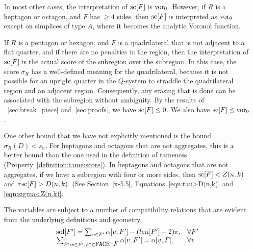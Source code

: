 In most other cases, the interpretation of $\sc[F]$ is $\vor_0$.
However, if $R$ is a heptagon or octagon, and $F$ has $\ge4$
sides, then $\sc[F]$ is interpreted as $\vor_0$ except on
simplices of type $A$, where it becomes the analytic Voronoi
function.

If $R$ is a pentagon or hexagon, and $F$ is a quadrilateral that is
not adjacent to a flat quarter, and if there are no penalties in the
region, then the interpretation of $\sc[F]$ is the actual score of
the subregion over the subregion. In this case, the score $\sigma_R$
has a well-defined meaning for the quadrilateral, because it is not
possible for an upright quarter in the $Q$-system to straddle the
quadrilateral region and an adjacent region. Consequently, any
erasing that is done can be associated with the subregion without
ambiguity. By the results of \Chaps~\ref{sec:break_piece}
and~\ref{sec:proofs}, we have $\sc[F]\le0$. We also have
$\sc[F]\le\vor_0$.

One other bound that we have not explicitly mentioned is the bound
$\sigma_R(D)< s_n$.  For heptagons and octagons that are not
aggregates, this is a better bound than the one used in the
definition of tameness (Property~\ref{definition:tame:score}). In
heptagons and octagons that are not aggregates, if we have a
subregion with four or more sides, then $\sc[F]< Z(n,k)$ and
$\tausc[F]>D(n,k)$. (See Section~\ref{x-5.5},
Equations~\ref{eqn:tau>D(n,k)} and \ref{eqn:sigma<Z(n,k)}.


The variables are subject to a number of compatibility relations
that are evident from the underlying definitions and geometry.
    $$
    \begin{array}{lll}
    \sol[F'] = \sum_{v\in F'}\alpha[v,F'] - (len[F']-2)\pi,&\forall F'\\
    \sum_{F':v\in F',F'\in \marku{FACE-\tildeF }} \alpha[v,F'] =
    \alpha[v,F], &\forall v
    \end{array}
    $$

